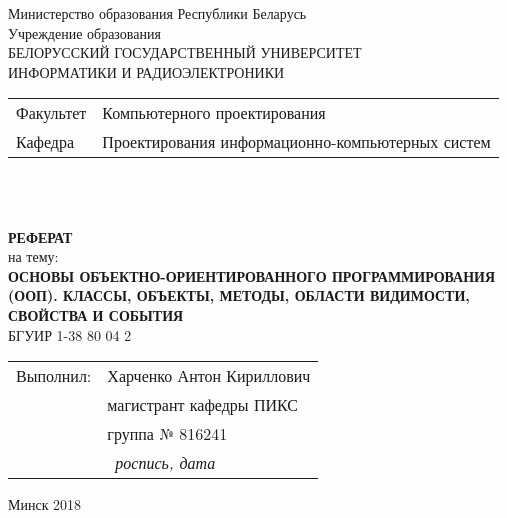 \begin{titlepage}
  \begin{center}
    Министерство образования Республики Беларусь\\[1em]
    Учреждение образования\\
    БЕЛОРУССКИЙ ГОСУДАРСТВЕННЫЙ УНИВЕРСИТЕТ \\
    ИНФОРМАТИКИ И РАДИОЭЛЕКТРОНИКИ\\[1em]

    \begin{minipage}{\textwidth}
      \begin{flushleft}
        \begin{tabular}{ l l }
          Факультет & Компьютерного проектирования\\
          Кафедра   & Проектирования информационно-компьютерных систем
        \end{tabular}
      \end{flushleft}
    \end{minipage}\\[3em]

	\begin{minipage}{0.4\textwidth}
		
	\end{minipage}\\[2.2em]

    \textbf{РЕФЕРАТ}\\
    {на тему:}\\[1em]
    \textbf{\large\MakeUppercase{Основы объектно-ориентированного программирования (ООП). Классы, объекты, методы, области видимости, свойства и события}}\\[1em]

    {БГУИР 1-38 80 04 2}\\[2em]
    
    \begin{flushright}
      \begin{tabular}{ l l }
        Выполнил: & Харченко Антон Кириллович\\
        & магистрант кафедры ПИКС\\
        & группа № 816241\\
        & \hrulefill \ \textit{роспись, дата}\\
      \end{tabular}
    \end{flushright}
    
    \vfill
    {\normalsize Минск 2018}
  \end{center}
\end{titlepage}